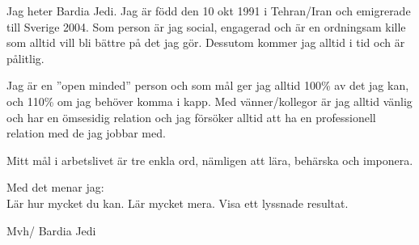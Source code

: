 \documentclass[12pt,a4paper]{article}
\begin{document}
	\begin{flushleft}
			Jag heter Bardia Jedi.	
			Jag är född den 10 okt 1991 i Tehran/Iran och emigrerade till Sverige 2004. 
			Som person är jag social, engagerad och är en ordningsam kille som alltid vill bli	bättre på det jag gör. 
			Dessutom kommer jag alltid i tid och är pålitlig.
\vspace{12pt}

			Jag är en ”open minded” person och som mål ger jag alltid 100\% av det jag kan, och 110\% om jag behöver komma i kapp. 
			Med vänner/kollegor är jag alltid vänlig och har en ömsesidig relation och jag försöker alltid att ha en professionell relation med de jag jobbar med.
			\vspace{12pt}

		Mitt mål i arbetslivet är tre enkla ord, nämligen att lära, behärska och imponera.
		\vspace{12pt}		
		
		Med det menar jag:\\
		Lär hur mycket du kan. Lär mycket mera. Visa ett lyssnade resultat.
		\vspace{24pt}
		
		Mvh/ Bardia Jedi
	\end{flushleft}
	
	
	
\end{document}
